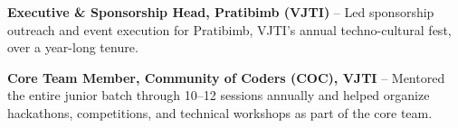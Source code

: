\begin{ResumeItemize}
  \IfApplied{
    \ResearchPaper%
    \GoogleML%
  }

  \IfQuantResearch{
    \LeetCode%
    \CGPAAchievement%
  }

  \IfQuantTrader{
    \LeetCode%
    \CGPAAchievement%
  }

  \IfAnalytics{
    \ResearchPaper%
    \GoogleML%
  }

  \IfNPCI{
    \AWS%
    \LeetCode%
  }

  \IfPyDS{
    \ResearchPaper%
    \GoogleML%
  }

  \item \textbf{Executive \& Sponsorship Head, Pratibimb (VJTI)} --
    Led sponsorship outreach and event execution for Pratibimb,
    VJTI's annual techno-cultural fest, over a year-long tenure.
  \item \textbf{Core Team Member, Community of Coders (COC), VJTI} --
    Mentored the entire junior batch through 10--12 sessions
    annually and helped organize hackathons, competitions, and
    technical workshops as part of the core team.

\end{ResumeItemize}
